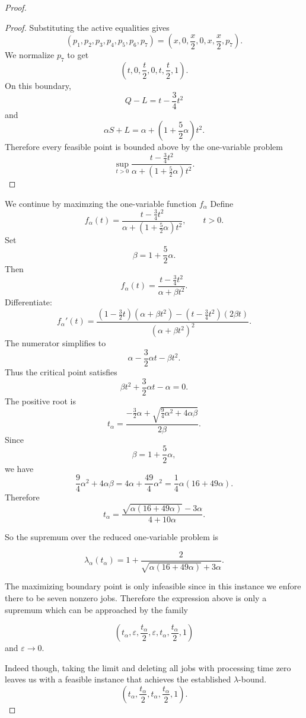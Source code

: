 \documentclass[11pt]{article}
\begin{document}
\begin{proof}
\begin{proof}
Substituting the active equalities gives
\[
(p_1,p_2,p_3,p_4,p_5,p_6,p_7)
=
\left(x,0,\frac{x}{2},0,x,\frac{x}{2},p_7\right).
\]
We normalize \(p_7\) to get
\[
\left(t,0,\frac{t}{2},0,t,\frac{t}{2},1\right).
\]
On this boundary,
\[
Q-L=t-\frac34t^2
\]
and
\[
\alpha S+L
=
\alpha+\left(1+\frac52\alpha\right)t^2.
\]
Therefore every feasible point is bounded above by the one-variable
problem
\[
\sup_{t>0}
\frac{t-\frac34t^2}
{\alpha+\left(1+\frac52\alpha\right)t^2}.
\]
\end{proof}
\noindent
We continue by maximzing the one-variable function $f_{\alpha}$
Define
\[
f_\alpha(t)
=
\frac{t-\frac34t^2}{\alpha+\left(1+\frac52\alpha\right)t^2},
\qquad t>0.
\]
Set
\[
\beta=1+\frac52\alpha.
\]
Then
\[
f_\alpha(t)=\frac{t-\frac34t^2}{\alpha+\beta t^2}.
\]
Differentiate:
\[
f_\alpha'(t)
=
\frac{
\left(1-\frac32t\right)(\alpha+\beta t^2)
-
\left(t-\frac34t^2\right)(2\beta t)
}{
(\alpha+\beta t^2)^2
}.
\]
The numerator simplifies to
\[
\alpha-\frac32\alpha t-\beta t^2.
\]
Thus the critical point satisfies
\[
\beta t^2+\frac32\alpha t-\alpha=0.
\]
The positive root is
\[
t_\alpha
=
\frac{
-\frac32\alpha+\sqrt{\frac94\alpha^2+4\alpha\beta}
}{
2\beta
}.
\]
Since
\[
\beta=1+\frac52\alpha,
\]
we have
\[
\frac94\alpha^2+4\alpha\beta
=
4\alpha+\frac{49}{4}\alpha^2
=
\frac14\alpha(16+49\alpha).
\]
Therefore
\[
t_\alpha
=
\frac{\sqrt{\alpha(16+49\alpha)}-3\alpha}{4+10\alpha}.
\]

So the supremum over the reduced one-variable problem is

\[
\lambda_\alpha(t_\alpha)
= 1+
\frac{2}{\sqrt{\alpha(16+49\alpha)}+3\alpha}.
\]


The maximizing boundary point is only infeasible since in this instance we enfore 
there to be seven nonzero jobs. 
Therefore the expression above is only a supremum which can be approached by the family

\[
\left(
t_\alpha,\varepsilon,\frac{t_\alpha}{2},
\varepsilon,t_\alpha,\frac{t_\alpha}{2},1
\right)
\]
and $\varepsilon \rightarrow 0$.


Indeed though, taking the limit and deleting all jobs with processing time zero leaves us with a 
feasible instance that achieves the established $\lambda$-bound.
\[
\left(
t_\alpha,\frac{t_\alpha}{2},t_\alpha,\frac{t_\alpha}{2},1
\right).
\]


\end{proof}
\end{document}
